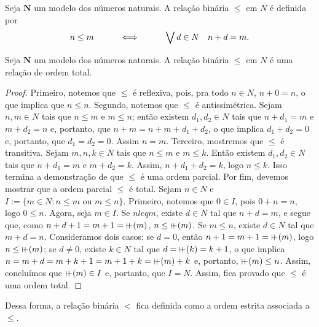 \begin{definition}
	Seja $\bm N$ um modelo dos números naturais. A relação binária $\leq$ em $N$ é definida por
	\begin{equation*}
	n \leq m \qquad \quad \Longleftrightarrow \quad \qquad \bigvee\nolimits d \in N \quad n+d=m.
	\end{equation*}
\end{definition}

\begin{proposition}
	Seja $\bm N$ um modelo dos números naturais. A relação binária $\leq$ em $N$ é uma relação de ordem total.
\end{proposition}
\begin{proof}
	Primeiro, notemos que $\leq$ é reflexiva, pois, pra todo $n \in N$, $n+0=n$, o que implica que $n \leq n$. Segundo, notemos que $\leq$ é antissimétrica. Sejam $n,m \in N$ tais que $n \leq m$ e $m \leq n$; então existem $d_1,d_2 \in N$ tais que $n+d_1=m$ e $m+d_2=n$ e, portanto, que $n+m=n+m+d_1+d_2$, o que implica $d_1+d_2=0$ e, portanto, que $d_1=d_2=0$. Assim $n=m$. Terceiro, mostremos que $\leq$ é transitiva. Sejam $m,n,k \in N$ tais que $n \leq m$ e $m \leq k$. Então existem $d_1,d_2 \in N$ tais que $n+d_1=m$ e $m+d_2=k$. Assim, $n+d_1+d_2=k$, logo $n \leq k$. Isso termina a demonstração de que $\leq$ é uma ordem parcial. Por fim, devemos mostrar que a ordem parcial $\leq$ é total. Sejam $n \in N$ e $I := \{m \in N: n \leq m \text{\ \ ou\ \ } m \leq n\}$. Primeiro, notemos que $0 \in I$, pois $0+n=n$, logo $0 \leq n$. Agora, seja $m \in I$. Se $n leq m$, existe $d \in N$ tal que $n+d=m$, e segue que, como $n+d+1=m+1=\suce(m)$, $n \leq \suce(m)$. Se $m \leq n$, existe $d \in N$ tal que $m+d=n$. Consideramos dois casos: se $d=0$, então $n+1=m+1=\suce(m)$, logo $n \leq \suce(m)$; se $d \neq 0$, existe $k \in N$ tal que $d=\suce(k)=k+1$, o que implica $n=m+d=m+k+1=m+1+k=\suce(m)+k$ e, portanto, $\suce(m) \leq n$. Assim, concluímos que $\suce(m) \in I$ e, portanto, que $I=N$. Assim, fica provado que $\leq$ é uma ordem total.
\end{proof}

	Dessa forma, a relação binária $<$ fica definida como a ordem estrita associada a $\leq$.

